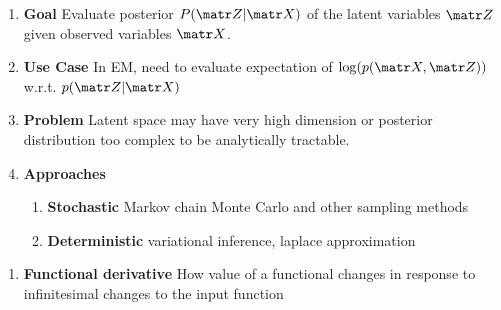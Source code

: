 \documentclass[11pt]{article}
\begin{document}
\begin{enumerate}
    \item \textbf{Goal} Evaluate posterior $P(\bZ | \bX)$ of the latent variables $\bZ$ given observed variables $\bX$.
    \item \textbf{Use Case} In EM, need to evaluate expectation of $\log(p(\bX, \bZ))$ w.r.t. $p(\bZ | \bX)$ 
    \item \textbf{Problem} Latent space may have very high dimension or posterior distribution too complex to be analytically tractable. 
    \item \textbf{Approaches} 
    \begin{enumerate}
        \item \textbf{Stochastic} Markov chain Monte Carlo and other sampling methods
        \item \textbf{Deterministic} variational inference, laplace approximation
    \end{enumerate}
\end{enumerate}




\begin{enumerate}
    \item \textbf{Functional derivative} How value of a functional changes in response to infinitesimal changes to the input function
\end{enumerate}

 
\end{document}
